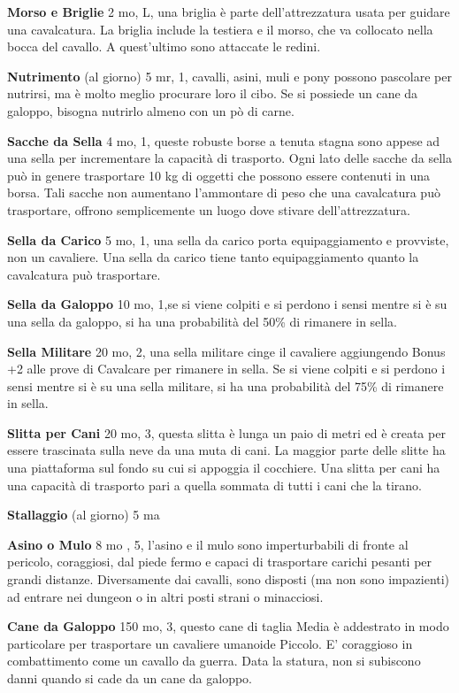 \documentclass[a4paper,11pt,twoside,openany]{book}
\begin{document}
\textbf{Morso e Briglie} 2 mo, L, una briglia è parte dell'attrezzatura usata per guidare una cavalcatura. La briglia include la testiera e il morso, che va collocato nella bocca del cavallo. A quest'ultimo sono attaccate le redini.

\textbf{Nutrimento} (al giorno) 5 mr,  1, cavalli, asini, muli e pony possono pascolare per nutrirsi, ma è molto meglio procurare loro il cibo. Se si possiede un cane da galoppo, bisogna nutrirlo almeno con un pò di carne.

\textbf{Sacche da Sella} 4 mo, 1, queste robuste borse a tenuta stagna sono appese ad una sella per incrementare la capacità di trasporto.
Ogni lato delle sacche da sella può in genere trasportare 10 kg di oggetti che possono essere contenuti in una borsa.
Tali sacche non aumentano l'ammontare di peso che una cavalcatura può trasportare, offrono semplicemente un luogo dove stivare dell'attrezzatura.

\textbf{Sella da Carico} 5 mo, 1, una sella da carico porta equipaggiamento e provviste, non un cavaliere. Una sella da carico tiene tanto equipaggiamento quanto la cavalcatura può trasportare.

\textbf{Sella da Galoppo} 10 mo, 1,se si viene colpiti e si perdono i sensi mentre si è su una sella da galoppo, si ha una probabilità del 50\% di rimanere in sella.

\textbf{Sella Militare} 20 mo, 2, una sella militare cinge il cavaliere aggiungendo Bonus +2 alle prove di Cavalcare per rimanere in sella. Se si viene colpiti e si perdono i sensi mentre si è su una sella militare, si ha una probabilità del 75\% di rimanere in sella.

\textbf{Slitta per Cani} 20 mo, 3, questa slitta è lunga un paio di metri ed è creata per essere trascinata sulla neve da una muta di cani. La maggior parte delle slitte ha una piattaforma sul fondo su cui si appoggia il cocchiere.
Una slitta per cani ha una capacità di trasporto pari a quella sommata di tutti i cani che la tirano.

\textbf{Stallaggio} (al giorno) 5 ma

\textbf{Asino o Mulo} 8 mo , 5, l'asino e il mulo sono imperturbabili di fronte al pericolo, coraggiosi, dal piede fermo e capaci di trasportare carichi pesanti per grandi distanze. Diversamente dai cavalli, sono disposti (ma non sono impazienti) ad entrare nei dungeon o in altri posti strani o minacciosi.

\textbf{Cane da Galoppo} 150 mo, 3, questo cane di taglia Media è addestrato in modo particolare per trasportare un cavaliere umanoide Piccolo. E' coraggioso in combattimento come un cavallo da guerra. Data la statura, non si subiscono danni quando si cade da un cane da galoppo.
\end{document}
